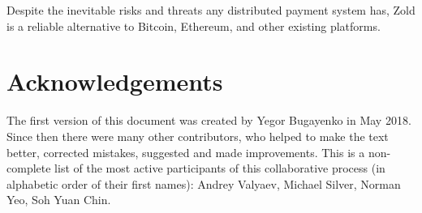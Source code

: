 \documentclass[11pt,oneside]{article}
\begin{document}
Despite the inevitable risks and threats any distributed payment system
has, Zold is a reliable alternative to Bitcoin, Ethereum, and
other existing platforms.

\section{Acknowledgements}

The first version of this document was created by Yegor Bugayenko in May 2018.
Since then there were many other contributors, who helped to make the text better,
corrected mistakes, suggested and made improvements. This is a non-complete list
of the most active participants of this collaborative process
(in alphabetic order of their first names):
%
Andrey Valyaev,
Michael Silver,
Norman Yeo,
Soh Yuan Chin.

\raggedright
\printbibliography%
\end{document}
